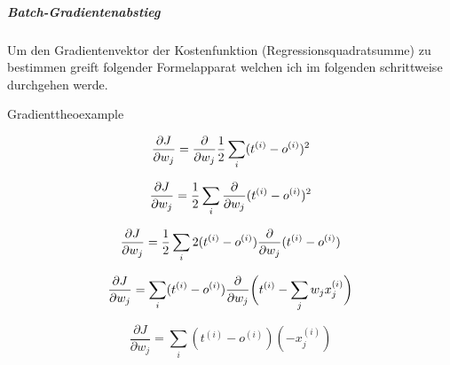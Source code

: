 \subparagraph{Batch-Gradientenabstieg}
Um den Gradientenvektor der Kostenfunktion (Regressionsquadratsumme) zu bestimmen greift folgender Formelapparat welchen ich im folgenden schrittweise durchgehen werde.

\vspace{2 mm}
\begin{minipage}{\textwidth}
\begin{myderivation}{Gradient}{theoexample} \label{deri:grad}

\begin{equation} \label{eq:gr1}
\frac{\partial J}{\partial w_j} = \frac{\partial }{\partial w_j} \frac{1}{2} \sum_i  (t^{(i)} - o^{(i)})^2 \\
\end{equation}

\begin{equation} \label{eq:gr2}
\frac{\partial J}{\partial w_j} = \frac{1}{2} \sum_i \frac{\partial}{\partial w_j} (t^{(i)} - o^{(i)})^2 \\
\end{equation}

\begin{equation} \label{eq:gr3}
\frac{\partial J}{\partial w_j} = \frac{1}{2} \sum_i 2 (t^{(i)} - o^{(i)}) \frac{\partial}{\partial w_j} (t^{(i)} - o^{(i)}) \\
\end{equation}

\begin{equation} \label{eq:gr4}
\frac{\partial J}{\partial w_j} = \sum_i (t^{(i)} - o^{(i)}) \frac{\partial}{\partial w_j} \bigg(t^{(i)} - \sum_j w_j x^{(i)}_{j}\bigg) \\
\end{equation}

\begin{equation} \label{eq:gr5}
\frac{\partial J}{\partial w_j} = \sum_i  (t^{(i)} - o^{(i)})(-x^{(i)}_{j})
\end{equation}

\end{myderivation}
\end{minipage}


